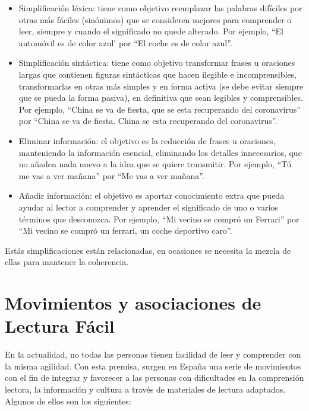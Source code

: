  \begin{itemize}
	
	\item Simplificación léxica: tiene como objetivo reemplazar las palabras difíciles por otras más fáciles (sinónimos) que se consideren mejores para comprender o leer, siempre y cuando el significado no quede alterado. Por ejemplo, ``El automóvil es de color azul' por ``El coche es de color azul''.
	
	\item Simplificación sintáctica: tiene como objetivo transformar frases u oraciones largas que contienen figuras sintácticas que hacen ilegible e incomprensibles, transformarlas en otras más simples y en forma activa (se debe evitar siempre que se pueda la forma pasiva), en definitiva que sean legibles y comprensibles. Por ejemplo, ``China se va de fiesta, que se esta recuperando del coronavirus'' por ``China se va de fiesta. China se esta recuperando del coronavirus''. 
	
	\item Eliminar información: el objetivo es la reducción de frases u oraciones, manteniendo la información esencial, eliminando los detalles innecesarios, que no añaden nada nuevo a la idea que se quiere transmitir. Por ejemplo, ``Tú me vas a ver mañana'' por ``Me vas a ver mañana''. 
	
	\item Añadir información: el objetivo es aportar conocimiento extra que pueda ayudar al lector a comprender y aprender el significado de uno o varios términos que desconozca. Por ejemplo, ``Mi vecino se compró un Ferrari'' por ``Mi vecino se compró un ferrari, un coche deportivo caro''. 
	
\end{itemize}


 Estás simplificaciones están relacionadas, en ocasiones se necesita la mezcla de ellas para mantener la coherencia.




\section{Movimientos y asociaciones de Lectura Fácil}
En la actualidad, no todas las personas tienen facilidad de leer y comprender con la misma agilidad. Con esta premisa, surgen en España una serie de movimientos con el fin de integrar y favorecer a las personas con dificultades en la comprensión lectora, la información y cultura a través de materiales de lectura adaptados. Algunos de ellos son los siguientes:


